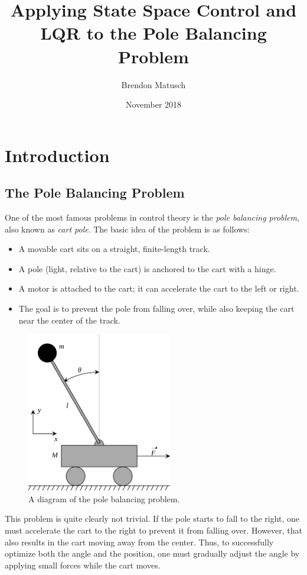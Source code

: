 \documentclass[12pt]{article}
\begin{document}
\title{Applying State Space Control and LQR to the Pole Balancing Problem}
\author{Brendon Matusch}
\date{November 2018}
\maketitle

\section{Introduction}

\subsection{The Pole Balancing Problem}

One of the most famous problems in control theory is the \textit{pole balancing problem}, also known as \textit{cart pole}. The basic idea of the problem is as follows:
\begin{itemize}
    \item A movable cart sits on a straight, finite-length track.
    \item A pole (light, relative to the cart) is anchored to the cart with a hinge.
    \item A motor is attached to the cart; it can accelerate the cart to the left or right.
    \item The goal is to prevent the pole from falling over, while also keeping the cart near the center of the track.
\end{itemize}

\begin{figure}[h]
    \centering
    \includegraphics[width=180pt]{cartpole}
    \caption{\label{cartpole} A diagram of the pole balancing problem.}
\end{figure}

This problem is quite clearly not trivial. If the pole starts to fall to the right, one must accelerate the cart to the right to prevent it from falling over. However, that also results in the cart moving away from the center. Thus, to successfully optimize both the angle and the position, one must gradually adjust the angle by applying small forces while the cart moves.
\end{document}
